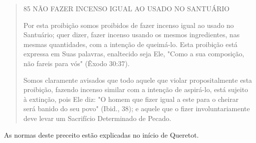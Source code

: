 \begin{quote}
85 NÃO FAZER INCENSO IGUAL AO USADO NO SANTUÁRIO

Por esta proibição somos proibidos de fazer incenso igual ao usado no
Santuário; quer dizer, fazer incenso usando os mesmos ingredientes, nas
mes­mas quantidades, com a intenção de queimá-lo. Esta proibição está
expressa em Suas palavras, enaltecido seja Ele, "Como a sua composição,
não fareis para vós" (Êxodo 30:37).

Somos claramente avisados que todo aquele que violar proposital­mente
esta proibição, fazendo incenso similar com a intenção de aspirá-lo,
está sujeito à extinção, pois Ele diz: "O homem que fizer igual a este
para o cheirar será banido do seu povo" (Ibid., 38); e aquele que o
fizer involuntariamente deve levar um Sacrifício Determinado de Pecado.
\end{quote}

As normas deste preceito estão explicadas no início de Queretot.

